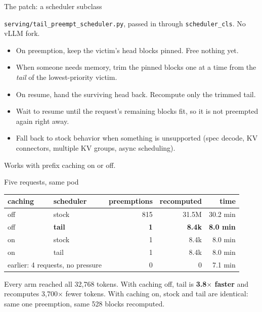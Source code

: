 \documentclass[aspectratio=169]{beamer}
\begin{document}
\begin{frame}{The patch: a scheduler subclass}

\texttt{serving/tail\_preempt\_scheduler.py}, passed in through \texttt{scheduler\_cls}. No vLLM fork.

\begin{itemize}
  \item On preemption, keep the victim's head blocks pinned. Free nothing yet.
  \item When someone needs memory, trim the pinned blocks one at a time from the \emph{tail} of the lowest-priority victim.
  \item On resume, hand the surviving head back. Recompute only the trimmed tail.
  \item Wait to resume until the request's remaining blocks fit, so it is not preempted again right away.
  \item Fall back to stock behavior when something is unsupported (spec decode, KV connectors, multiple KV groups, async scheduling).
\end{itemize}

Works with prefix caching on or off.

\end{frame}

\begin{frame}{Five requests, same pod}

\begin{center}
\begin{tabular}{llrrr}
\toprule
caching & scheduler & preemptions & recomputed & time \\
\midrule
off & stock & 815 & 31.5M & 30.2 min \\
off & \textbf{tail} & \textbf{1} & \textbf{8.4k} & \textbf{8.0 min} \\
on & stock & 1 & 8.4k & 8.0 min \\
on & tail & 1 & 8.4k & 8.0 min \\
\midrule
\multicolumn{2}{l}{earlier: 4 requests, no pressure} & 0 & 0 & 7.1 min \\
\bottomrule
\end{tabular}
\end{center}

Every arm reached all 32{,}768 tokens. With caching off, tail is \textbf{3.8$\times$ faster} and recomputes 3{,}700$\times$ fewer tokens.
With caching on, stock and tail are identical: same one preemption, same 528 blocks recomputed.

\end{frame}
\end{document}
